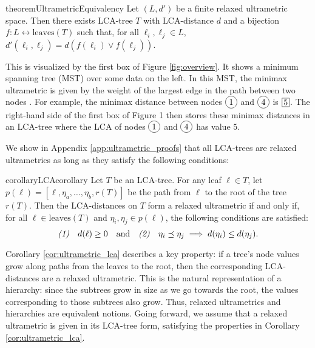 \begin{restatable}{theorem}{UltrametricEquivalency}
    \label{thm:ultrametric_equivalency}
    Let $(L, d')$ be a finite relaxed ultrametric space. Then there exists LCA-tree $T$ with LCA-distance $d$ and a bijection $f:L \leftrightarrow \text{leaves}(T)$ such that, for all $\ell_i, \ell_j \in L$, $d'(\ell_i, \ell_j) = d \left( f(\ell_i) \lor f(\ell_j) \right)$.
\end{restatable}

This is visualized by the first box of Figure \ref{fig:overview}. It shows a minimum spanning tree (MST) over some data on the left. In this MST, the minimax ultrametric is given by the weight of the largest edge in the path between two nodes \cite{minimax_distance}. For example, the minimax distance between nodes $\circled{1}$ and $\circled{4}$ is $\putinsquare{5}$. The right-hand side of the first box of Figure 1 then stores these minimax distances in an LCA-tree where the LCA of nodes $\circled{1}$ and $\circled{4}$ has value $5$.

We show in Appendix \ref{app:ultrametric_proofs} that all LCA-trees are relaxed ultrametrics as long as they satisfy the following conditions:

\begin{restatable}{corollary}{LCAcorollary}
    \label{cor:ultrametric_lca}
    Let $T$ be an LCA-tree. For any leaf $\ell \in T$, let $p(\ell) = [\ell, \eta_a, \ldots, \eta_b, r(T)]$ be the path from $\ell$ to the root of the tree $r(T)$.
    Then the LCA-distances on $T$ form a relaxed ultrametric if and only if, for all $\ell \in \text{leaves}(T)$ and $\eta_i, \eta_j \in p(\ell)$, the following conditions are satisfied:
    \[\text{\emph{(1)}} \quad d(\ell) \geq 0 \quad \text{and} \quad \text{\emph{(2)}} \quad \eta_i \preceq \eta_j \implies d(\eta_i) \leq d(\eta_j).\]
\end{restatable}
%
Corollary \ref{cor:ultrametric_lca} describes a key property: if a tree's node values grow along paths from the leaves to the root, then the corresponding LCA-distances are a relaxed ultrametric. This is the natural representation of a hierarchy: since the subtrees grow in size as we go towards the root, the values corresponding to those subtrees also grow. Thus, relaxed ultrametrics and hierarchies are equivalent notions. Going forward, we assume that a relaxed ultrametric is given in its LCA-tree form, satisfying the properties in Corollary \ref{cor:ultrametric_lca}.